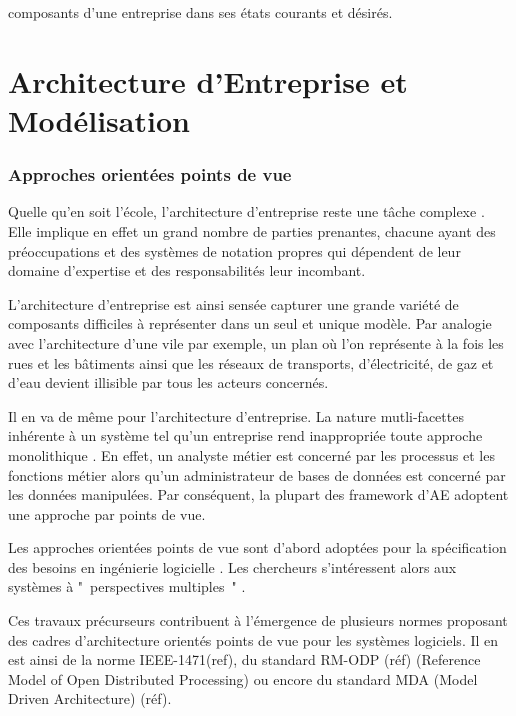 composants d'une entreprise dans ses états courants et désirés.  

\section{Architecture d'Entreprise et Modélisation}

\subsubsection{Approches orientées points de vue}

Quelle qu'en soit l'école, l'architecture d'entreprise reste une tâche complexe 
\cite{steen2004supporting}. Elle implique en effet un grand nombre de parties prenantes, chacune ayant des préoccupations et des systèmes de notation propres qui
dépendent de leur domaine d'expertise et des responsabilités leur incombant.

L'architecture d'entreprise est ainsi sensée capturer une grande variété de composants difficiles à représenter dans un seul et unique modèle. 
Par analogie avec l'architecture d'une vile par exemple, un plan où l'on représente à la fois les rues et les bâtiments ainsi que les réseaux de transports, d'électricité, de gaz et d'eau devient illisible par tous les acteurs concernés.

Il en va de même pour l'architecture d'entreprise. La nature mutli-facettes inhérente à un système tel qu'un entreprise rend inappropriée toute approche monolithique 
\cite{armour1999bigpicture}. En effet, un analyste métier est concerné par les 
processus et les fonctions métier alors qu'un administrateur de bases de données 
est concerné par les données manipulées. Par conséquent, la plupart des 
framework d'AE adoptent une approche par points de vue.

Les approches orientées points de vue sont d'abord adoptées pour la 
spécification des besoins en ingénierie logicielle \cite{mullery1979core}. Les 
chercheurs s'intéressent alors aux systèmes à "~perspectives multiples~" 
\cite{finkelstein1992viewpoints} \cite{kotonya1996requirements} 
\cite{nuseibeh1994multi} \cite{meyers1993representing}. 

Ces travaux précurseurs contribuent à l'émergence de plusieurs normes proposant 
des cadres d'architecture orientés points de vue pour les systèmes logiciels. Il 
en est ainsi de la norme IEEE-1471(ref), du standard RM-ODP (réf) (Reference 
Model of Open Distributed Processing) ou encore du standard MDA (Model Driven 
Architecture) (réf).

